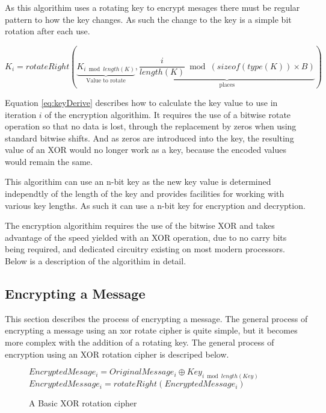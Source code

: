\documentclass[12pt]{article}
\begin{document}
  As this algorithim uses a rotating key to encrypt mesages there
  must be regular pattern to how the key changes. As such the
  change to the key is a simple bit rotation after each use. 

  \begin{equation}
    \label{eq:keyDerive}
    K_i = rotateRight(
        \underbrace{K_{i \bmod length(K)}}_\text{Value to rotate},
        \underbrace{\frac{i}{length(K)} \bmod (sizeof(type(K)) 
            \times B)}_\text{places}) 
  \end{equation}

  Equation \eqref{eq:keyDerive} describes how to calculate the key 
  value to use in iteration \( i \) of the encryption algorithim. 
  It requires the use of a bitwise rotate operation so that no data 
  is lost, through the replacement by zeros when using standard 
  bitwise shifts. And as zeros are introduced into the key, the 
  resulting value of an XOR would no longer work as a key, because
  the encoded values would remain the same.

  This algorithim can use an n-bit key as the new key value is
  determined independtly of the length of the key and provides
  facilities for working with various key lengths. As such it can use
  a n-bit key for encryption and decryption.

  The encryption algorithim requires the use of the bitwise XOR and
  takes advantage of the speed yielded with an XOR operation, due to
  no carry bits being required, and dedicated circuitry existing on most
  modern processors. Below is a description of the algorithim in detail.

  \subsection{Encrypting a Message}
    This section describes the process of encrypting a message.
    The general process of encrypting a message using an xor rotate
    cipher is quite simple, but it becomes more complex with the
    addition of a rotating key. The general process of encryption
    using an XOR rotation cipher is descriped below. 
    
    \begin{figure}[h]
    \begin{algorithmic}[1]
      \State $EncryptedMesage_i =
             OriginalMessage_i \oplus Key_{i \bmod length(Key)}$
      \State $EncryptedMessage_i = rotateRight(EncryptedMessage_i)$
    \EndFor 
    \end{algorithmic}
    \caption{A Basic XOR rotation cipher}
    \end{figure}
\end{document}

